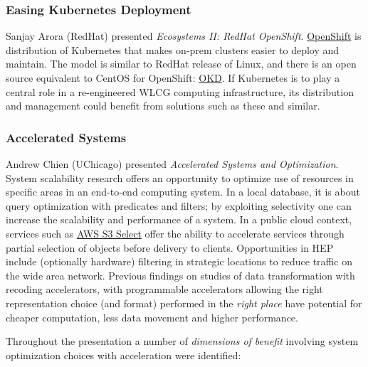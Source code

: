 \documentclass[11pt,letterpaper,fleqn]{article}
\begin{document}
\subsubsection{Easing Kubernetes Deployment}
\vspace{0.2cm}
Sanjay Arora (RedHat) presented {\it Ecosystems II: RedHat OpenShift}.  \href{https://www.openshift.com/}{OpenShift} is distribution of Kubernetes that makes on-prem clusters easier to deploy and maintain.  The model is similar to RedHat release of Linux, and there is an open source equivalent to CentOS for OpenShift: \href{https://www.okd.io/}{OKD}.  If Kubernetes is to play a central role in a re-engineered WLCG computing infrastructure, its distribution and management could benefit from solutions such as these and similar.


\subsubsection{Accelerated Systems}
\vspace{0.2cm}
Andrew Chien (UChicago) presented {\it Accelerated Systems and Optimization}.  System scalability research offers an opportunity to optimize use of resources in specific areas in an end-to-end computing system.   In a local database, it is about query optimization with predicates and filters; by exploiting selectivity one can increase the scalability and performance of a system. In a public cloud context, services such as \href{https://aws.amazon.com/blogs/aws/s3-glacier-select/}{AWS S3 Select} offer the ability to accelerate services through partial selection of objects before delivery to clients.  Opportunities in HEP include (optionally hardware) filtering in strategic locations to reduce traffic on the wide area network.  Previous findings on studies of data transformation with recoding accelerators, with programmable accelerators allowing the right representation choice (and format) performed in the {\it right place} have potential for cheaper computation, less data movement and higher performance.

Throughout the presentation a number of {\it dimensions of benefit} involving system optimization choices with acceleration were identified:
\end{document}
